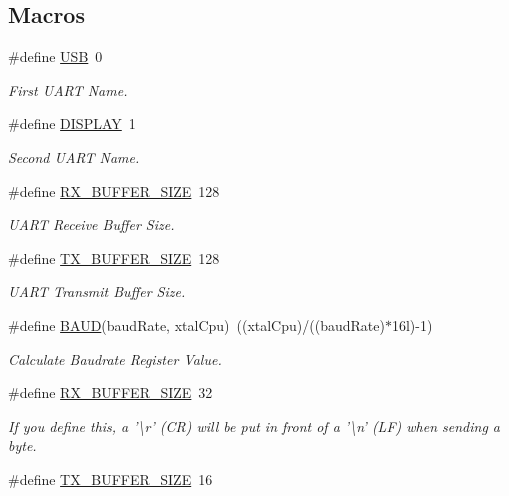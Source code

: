 \subsection*{Macros}
\begin{DoxyCompactItemize}
\item 
\#define \hyperlink{group__uart_ga779bf099075a999d1074357fccbd466b}{U\-S\-B}~0
\begin{DoxyCompactList}\small\item\em First U\-A\-R\-T Name. \end{DoxyCompactList}\item 
\#define \hyperlink{group__uart_gab4bf926a45354a2f328f1a7b94ebd3c5}{D\-I\-S\-P\-L\-A\-Y}~1
\begin{DoxyCompactList}\small\item\em Second U\-A\-R\-T Name. \end{DoxyCompactList}\item 
\#define \hyperlink{group__uart_ga739a2a1a0047c98ac1b18ecd25dac092}{R\-X\-\_\-\-B\-U\-F\-F\-E\-R\-\_\-\-S\-I\-Z\-E}~128
\begin{DoxyCompactList}\small\item\em U\-A\-R\-T Receive Buffer Size. \end{DoxyCompactList}\item 
\#define \hyperlink{group__uart_ga9ab33647617098646990fe263600b650}{T\-X\-\_\-\-B\-U\-F\-F\-E\-R\-\_\-\-S\-I\-Z\-E}~128
\begin{DoxyCompactList}\small\item\em U\-A\-R\-T Transmit Buffer Size. \end{DoxyCompactList}\item 
\#define \hyperlink{group__uart_gafccfd7d1315f0763ac404c6104883341}{B\-A\-U\-D}(baud\-Rate, xtal\-Cpu)~((xtal\-Cpu)/((baud\-Rate)$\ast$16l)-\/1)
\begin{DoxyCompactList}\small\item\em Calculate Baudrate Register Value. \end{DoxyCompactList}\item 
\#define \hyperlink{group__uart_ga739a2a1a0047c98ac1b18ecd25dac092}{R\-X\-\_\-\-B\-U\-F\-F\-E\-R\-\_\-\-S\-I\-Z\-E}~32
\begin{DoxyCompactList}\small\item\em If you define this, a '\textbackslash{}r' (C\-R) will be put in front of a '\textbackslash{}n' (L\-F) when sending a byte. \end{DoxyCompactList}\item 
\#define \hyperlink{group__uart_ga9ab33647617098646990fe263600b650}{T\-X\-\_\-\-B\-U\-F\-F\-E\-R\-\_\-\-S\-I\-Z\-E}~16

\end{DoxyCompactItemize}
